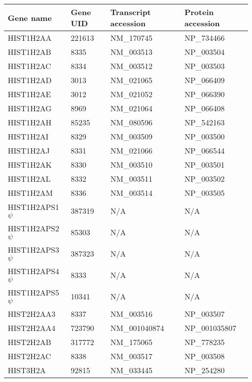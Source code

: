 \begin{tabular}{l | l | l | l }
  Gene name & Gene UID & Transcript accession & Protein accession \\
  \hline
   HIST1H2AA & 221613 & NM\_170745 & NP\_734466 \\
   HIST1H2AB & 8335 & NM\_003513 & NP\_003504 \\
   HIST1H2AC & 8334 & NM\_003512 & NP\_003503 \\
   HIST1H2AD & 3013 & NM\_021065 & NP\_066409 \\
   HIST1H2AE & 3012 & NM\_021052 & NP\_066390 \\
   HIST1H2AG & 8969 & NM\_021064 & NP\_066408 \\
   HIST1H2AH & 85235 & NM\_080596 & NP\_542163 \\
   HIST1H2AI & 8329 & NM\_003509 & NP\_003500 \\
   HIST1H2AJ & 8331 & NM\_021066 & NP\_066544 \\
   HIST1H2AK & 8330 & NM\_003510 & NP\_003501 \\
   HIST1H2AL & 8332 & NM\_003511 & NP\_003502 \\
   HIST1H2AM & 8336 & NM\_003514 & NP\_003505 \\
   HIST1H2APS1 $\psi$ & 387319 & N/A & N/A \\
   HIST1H2APS2 $\psi$ & 85303 & N/A & N/A \\
   HIST1H2APS3 $\psi$ & 387323 & N/A & N/A \\
   HIST1H2APS4 $\psi$ & 8333 & N/A & N/A \\
   HIST1H2APS5 $\psi$ & 10341 & N/A & N/A \\
   HIST2H2AA3 & 8337 & NM\_003516 & NP\_003507 \\
   HIST2H2AA4 & 723790 & NM\_001040874 & NP\_001035807 \\
   HIST2H2AB & 317772 & NM\_175065 & NP\_778235 \\
   HIST2H2AC & 8338 & NM\_003517 & NP\_003508 \\
   HIST3H2A & 92815 & NM\_033445 & NP\_254280 \\
\end{tabular}
